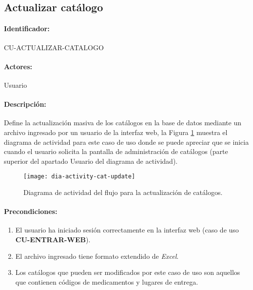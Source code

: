 \subsection{Actualizar catálogo}\label{cu-actualizar-catalogo}
\paragraph{Identificador:}
CU-ACTUALIZAR-CATALOGO
\paragraph{Actores:}
Usuario
\paragraph{Descripción:}
Define la actualización masiva de los catálogos en la base de datos mediante un archivo ingresado por un usuario de la interfaz web, la Figura \ref{fig:dia-activity-cat-update} muestra el diagrama de actividad para este caso de uso donde se puede apreciar que se inicia cuando el usuario solicita la pantalla de administración de catálogos (parte superior del apartado Usuario del diagrama de actividad).
\begin{figure}[h]
  \centering
  \texttt{[image: dia-activity-cat-update]}
  \caption{Diagrama de actividad del flujo para la actualización de catálogos.}
  \label{fig:dia-activity-cat-update}
\end{figure}
\paragraph{Precondiciones:}
\begin{enumerate}
  \item El usuario ha iniciado sesión correctamente en la interfaz web (caso de uso \textbf{CU-ENTRAR-WEB}).
  \item El archivo ingresado tiene formato extendido de \textit{Excel}\textsuperscript{\textcopyright}.
  \item Los catálogos que pueden ser modificados por este caso de uso son aquellos que contienen códigos de medicamentos y lugares de entrega.
\end{enumerate}
